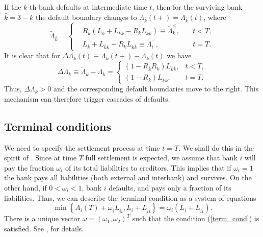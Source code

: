 If the $k$-th bank defaults at intermediate time $t$, then for the surviving bank $\bar{k} = 3 -k$ the default boundary changes to
$\Lambda_{\bar{k}}(t+) = \tilde{\Lambda}_{\bar{k}}(t)$, where
\begin{equation}
	\tilde{\Lambda}_{\bar{k}} = \left\{
	\begin{aligned}
	& R_{\bar{k}} (L_{\bar{k}} + L_{\bar{k} k} - R_k L_{k \bar{k}})  \equiv \tilde{\Lambda}_k^{<},  \quad & t < T,\\
	& L_{\bar{k}} + L_{\bar{k} k} - R_k L_{k \bar{k}}   \equiv \tilde{\Lambda}_i^{=},  & t = T.
	\end{aligned}
	\right.
\end{equation}
It is clear that for $\Delta \Lambda_k(t) \equiv \Lambda_k(t+)-\Lambda_k(t)$ we have
\begin{equation}
	\Delta \Lambda_k \equiv  \tilde{\Lambda}_k - \Lambda_k = 
	\begin{cases}
		 (1 - R_{\bar{k}} R_k) L_{k \bar{k}},  &t < T, \\
		 (1 - R_k) L_{k \bar{k}},  &t = T.
	\end{cases}
\end{equation}
Thus, $\Delta  \Lambda_k > 0$ and the corresponding default boundaries move to the right.
This mechanism can therefore trigger cascades of defaults.

\subsection{Terminal conditions}
We need to specify the settlement process at time $t = T$. We shall do this in the spirit of \cite{Eisenberg}. Since at time $T$ full settlement is expected, we assume that bank $i$ will pay the fraction $\omega_i$ of its total liabilities to creditors. This implies that if $\omega_i = 1$ the bank pays all liabilities (both external and interbank) and survives. On the other hand, if $0 < \omega_i < 1$, bank $i$ defaults, and pays only a fraction of its liabilities. Thus, we can describe the terminal condition as a system of equations
\begin{equation}
	\label{term_cond}
	\min \left\{A_i(T) + \omega_{\bar{i}} L_{\bar{i}i}, L_i + L_{i \bar{i}}  \right\} = \omega_i \left(L_i + L_{i \bar{i}} \right).
\end{equation}
There is a unique vector $\omega = (\omega_1, \omega_2)^T$ such that the condition (\ref{term_cond}) is satisfied. See \cite{Lipton2015}, \cite{LiptonItkin2015} for details.



